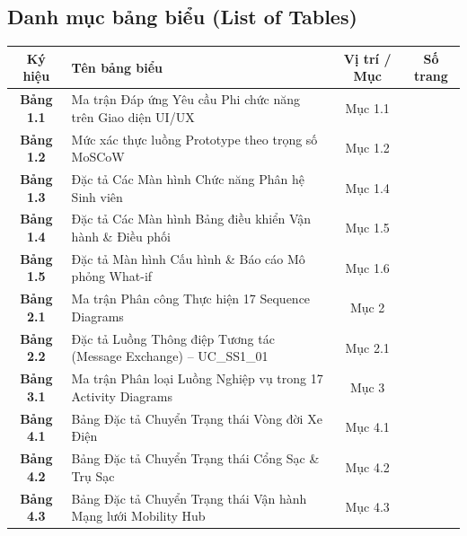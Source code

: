 \documentclass[12pt,a4paper]{article}
\begin{document}
\subsection*{Danh mục bảng biểu (List of Tables)}
\begin{center}
\renewcommand{\arraystretch}{1.2}
\small
\begin{tabularx}{\textwidth}{|c|X|c|c|}
    \hline
    \textbf{Ký hiệu} & \textbf{Tên bảng biểu} & \textbf{Vị trí / Mục} & \textbf{Số trang} \\
    \hline
    \textbf{Bảng 1.1} & Ma trận Đáp ứng Yêu cầu Phi chức năng trên Giao diện UI/UX & Mục 1.1 & \pageref{tab:ui-nfr-matrix} \\
    \hline
    \textbf{Bảng 1.2} & Mức xác thực luồng Prototype theo trọng số MoSCoW & Mục 1.2 & \pageref{tab:moscow-scope} \\
    \hline
    \textbf{Bảng 1.3} & Đặc tả Các Màn hình Chức năng Phân hệ Sinh viên & Mục 1.4 & \pageref{tab:ui-student-screens} \\
    \hline
    \textbf{Bảng 1.4} & Đặc tả Các Màn hình Bảng điều khiển Vận hành \& Điều phối & Mục 1.5 & \pageref{tab:ui-operator-screens} \\
    \hline
    \textbf{Bảng 1.5} & Đặc tả Màn hình Cấu hình \& Báo cáo Mô phỏng What-if & Mục 1.6 & \pageref{tab:ui-whatif-screens} \\
    \hline
    \textbf{Bảng 2.1} & Ma trận Phân công Thực hiện 17 Sequence Diagrams & Mục 2 & \pageref{tab:seq-assignment} \\
    \hline
    \textbf{Bảng 2.2} & Đặc tả Luồng Thông điệp Tương tác (Message Exchange) -- UC\_SS1\_01 & Mục 2.1 & \pageref{tab:msg-ss1-01} \\
    \hline
    \textbf{Bảng 3.1} & Ma trận Phân loại Luồng Nghiệp vụ trong 17 Activity Diagrams & Mục 3 & \pageref{tab:act-matrix} \\
    \hline
    \textbf{Bảng 4.1} & Bảng Đặc tả Chuyển Trạng thái Vòng đời Xe Điện & Mục 4.1 & \pageref{tab:state-ev-spec} \\
    \hline
    \textbf{Bảng 4.2} & Bảng Đặc tả Chuyển Trạng thái Cổng Sạc \& Trụ Sạc & Mục 4.2 & \pageref{tab:state-charger-spec} \\
    \hline
    \textbf{Bảng 4.3} & Bảng Đặc tả Chuyển Trạng thái Vận hành Mạng lưới Mobility Hub & Mục 4.3 & \pageref{tab:state-hub-spec} \\
    \hline
\end{tabularx}
\end{center}
\vspace*{\fill}
\newpage
\end{document}
